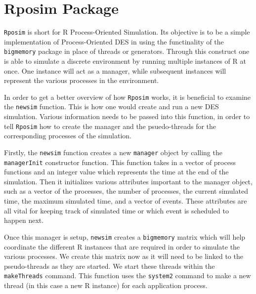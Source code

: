 \documentclass[a4paper, 11pt]{article} %
\begin{document}

\section{Rposim Package}


\texttt{Rposim} is short for R Process-Oriented Simulation. Its objective is to be a simple implementation of Process-Oriented DES in using the functinality of the \texttt{bigmemory} package in place of threads or generators. Through this construct one is able to simulate a discrete environment by running multiple instances of R at once. One instance will act as a manager, while subsequent instances will represent the various processes in the environment.

In order to get a better overview of how \texttt{Rposim} works, it is beneficial to examine the \texttt{newsim} function. This is how one would create and run a new DES simulation. Various information needs to be passed into this function, in order to tell \texttt{Rposim} how to create the manager and the psuedo-threads for the corresponding processes of the simulation.

Firstly, the \texttt{newsim} function creates a new \texttt{manager} object by calling the \texttt{managerInit} constructor function. This function takes in a vector of process functions and an integer value which represents the time at the end of the simulation. Then it initializes various attributes important to the manager object, such as a vector of the processes, the number of processes, the current simulated time, the maximum simulated time, and a vector of events. These attributes are all vital for keeping track of simulated time or which event is scheduled to happen next.

Once this manager is setup, \texttt{newsim} creates a \texttt{bigmemory} matrix which will help coordinate the different R instances that are required in order to simulate the various processes. We create this matrix now as it will need to be linked to the pseudo-threads as they are started. We start these threads within the \texttt{makeThreads} command. This function uses the \texttt{system2} command to make a new thread (in this case a new R instance) for each application process.
\end{document}

